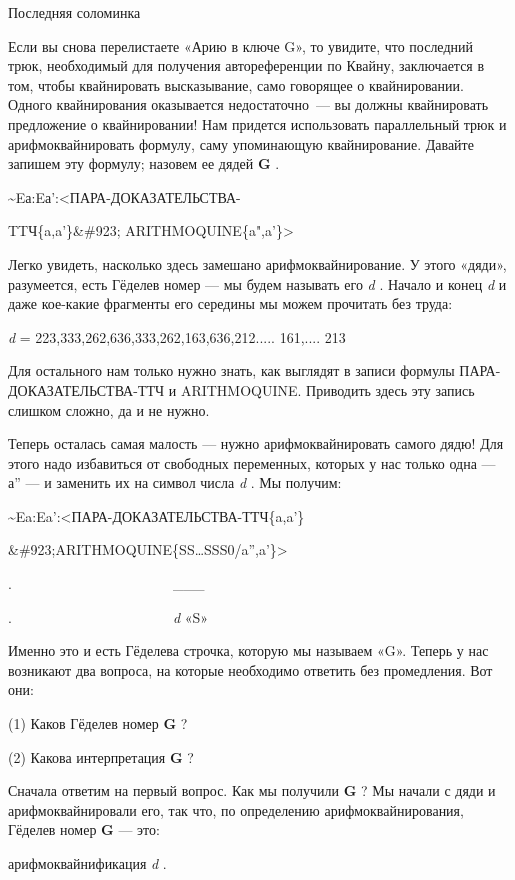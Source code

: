 \documentclass[../main.tex]{subfiles}
\begin{document}
Последняя соломинка

Если вы снова перелистаете «Арию в ключе G», то увидите, что последний трюк, необходимый для получения автореференции по Квайну, заключается в том, чтобы квайнировать высказывание, само говорящее о квайнировании. Одного квайнирования оказывается недостаточно~--- вы должны квайнировать предложение о квайнировании! Нам придется использовать параллельный трюк и арифмоквайнировать формулу, саму упоминающую квайнирование. Давайте запишем эту формулу; назовем ее дядей \textbf{G} .

\textasciitilde Eа:Eа':\textless ПАРА-ДОКАЗАТЕЛЬСТВА-

TTЧ\{a,a'\}\&\#923; ARITHMOQUINE\{a",a'\}\textgreater{}

Легко увидеть, насколько здесь замешано арифмоквайнирование. У этого «дяди», разумеется, есть Гёделев номер --- мы будем называть его \emph{d} . Начало и конец \emph{d} и даже кое-какие фрагменты его середины мы можем прочитать без труда:

\emph{d} = 223,333,262,636,333,262,163,636,212..... 161,.... 213

Для остального нам только нужно знать, как выглядят в записи формулы ПАРА-ДОКАЗАТЕЛЬСТВА-ТТЧ и ARITHMOQUINE. Приводить здесь эту запись слишком сложно, да и не нужно.

Теперь осталась самая малость --- нужно арифмоквайнировать самого дядю! Для этого надо избавиться от свободных переменных, которых у нас только одна --- а'' --- и заменить их на символ числа \emph{d} . Мы получим:

\textasciitilde Ea:Ea':\textless ПАРА-ДОКАЗАТЕЛЬСТВА-ТТЧ\{a,a'\}

\&\#923;ARITHMOQUINE\{SS\ldots SSS0/a'',a'\}\textgreater{}

.~~~~~~~~~~~~~~~~~~~~~~~\textbar\_\_\_\textbar{}

.~~~~~~~~~~~~~~~~~~~~~~~\emph{d} «S»~

Именно это и есть Гёделева строчка, которую мы называем «G». Теперь у нас возникают два вопроса, на которые необходимо ответить без промедления. Вот они:

(1) Каков Гёделев номер \textbf{G} ?

(2) Какова интерпретация \textbf{G} ?

Сначала ответим на первый вопрос. Как мы получили \textbf{G} ? Мы начали с дяди и арифмоквайнировали его, так что, по определению арифмоквайнирования, Гёделев номер \textbf{G} --- это:

арифмоквайнификация \emph{d} .
\end{document}
